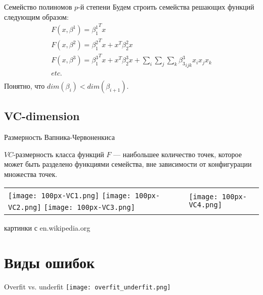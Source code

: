 \documentclass[14pt, fleqn, xcolor={dvipsnames, table}]{beamer}
\begin{document}
\begin{frame}{Семейство полиномов $p$-й степени}
Будем строить семейства решающих функций следующим образом:
\small
$$\begin{array}{l}
F(x, \beta^1) = {\beta_1^1}^Tx \\
F(x, \beta^2) = {\beta_1^2}^Tx + x^T{\beta_2^2}x\\
F(x, \beta^3) = {\beta_1^3}^Tx + x^T{\beta_2^3}x + \sum_i\sum_j\sum_k {\beta^3_3}_{ijk} x_i x_j x_k\\
etc.\\
\end{array}$$
Понятно, что $dim(\beta_i) < dim(\beta_{i+1})$.
\end{frame}

\subsection{VC-dimension}
\begin{frame}{Размерность Вапника-Червоненкиса}
\begin{definition}
$VC$-размерность класса функций $F$ --- наибольшее количество точек, которое может быть разделено функциями семейства, вне зависимости от конфигурации множества точек.
\end{definition}
\begin{tabular}{p{}p{}}
\colorbox{green!10}{
\texttt{[image: 100px-VC1.png]}\hspace{2px}
\texttt{[image: 100px-VC2.png]}\hspace{2px}
\texttt{[image: 100px-VC3.png]}\hspace{1px}
} & \colorbox{red!10}{
\texttt{[image: 100px-VC4.png]}\hspace{1px}
} \\
\end{tabular}
{\footnotesize картинки с en.wikipedia.org}
\end{frame}

\section{Виды ошибок}
\begin{frame}{Overfit vs. underfit}
\centering
\texttt{[image: overfit\_underfit.png]} 
\end{frame}
\end{document}
